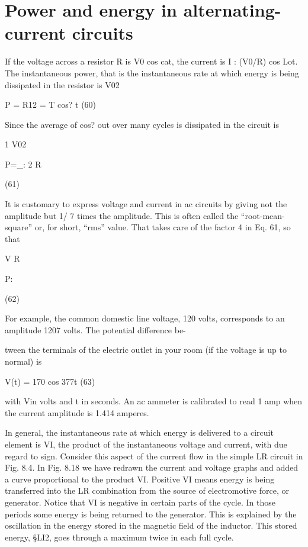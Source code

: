 \iffalse

\section{Power and energy in alternating-current circuits}
If the voltage across a resistor R is V0 cos cat, the current is
I : (V0/R) cos Lot. The instantaneous power, that is the instantaneous
rate at which energy is being dissipated in the resistor is
V02

\begin{equation}
\end{equation}
P = R12 = T cos? \omega t (60)

Since the average of cos? out over many cycles is %
dissipated in the circuit is

\begin{equation}
\end{equation}
1 V02

P=_:
2 R

(61)

It is customary to express voltage and current in ac circuits by giving
not the amplitude but 1/ \/7 times the amplitude. This is often called
the ``root-mean-square'' or, for short, ``rms'' value. That takes care
of the factor 4 in Eq. 61, so that

\begin{equation}
\end{equation}
V%
R

P:

(62)

For example, the common domestic line voltage, 120 volts, corresponds
to an amplitude 120\/7 volts. The potential difference be-

tween the terminals of the electric outlet in your room (if the voltage
is up to normal) is

\begin{equation}
\end{equation}
V(t) = 170 cos 377t (63)

with Vin volts and t in seconds. An ac ammeter is calibrated to read
1 amp when the current amplitude is 1.414 amperes.

In general, the instantaneous rate at which energy is delivered to
a circuit element is VI, the product of the instantaneous voltage and
current, with due regard to sign. Consider this aspect of the current
flow in the simple LR circuit in Fig. 8.4. In Fig. 8.18 we have redrawn
the current and voltage graphs and added a curve proportional to
the product VI. Positive VI means energy is being transferred into
the LR combination from the source of electromotive force, or
generator. Notice that VI is negative in certain parts of the cycle.
In those periods some energy is being returned to the generator.
This is explained by the oscillation in the energy stored in the magnetic
field of the inductor. This stored energy, §LI2, goes through
a maximum twice in each full cycle.

